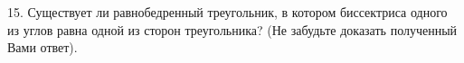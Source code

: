 15. Существует ли равнобедренный треугольник, в котором биссектриса одного из углов равна одной из сторон треугольника? (Не забудьте доказать полученный Вами ответ).\\
